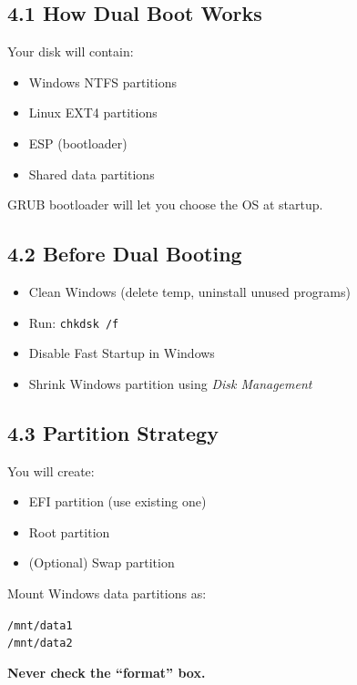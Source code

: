 \documentclass[12pt]{article}
\begin{document}
\subsection*{4.1 How Dual Boot Works}

Your disk will contain:

\begin{itemize}
    \item Windows NTFS partitions
    \item Linux EXT4 partitions
    \item ESP (bootloader)
    \item Shared data partitions
\end{itemize}

GRUB bootloader will let you choose the OS at startup.

\subsection*{4.2 Before Dual Booting}

\begin{itemize}
    \item Clean Windows (delete temp, uninstall unused programs)
    \item Run: \texttt{chkdsk /f}
    \item Disable Fast Startup in Windows
    \item Shrink Windows partition using \textit{Disk Management}
\end{itemize}

\subsection*{4.3 Partition Strategy}

You will create:

\begin{itemize}
    \item EFI partition (use existing one)
    \item Root partition
    \item (Optional) Swap partition
\end{itemize}

Mount Windows data partitions as:

\begin{highlightbox}
\texttt{/mnt/data1}\\
\texttt{/mnt/data2}
\end{highlightbox}

\begin{warningbox}
\textbf{Never check the ``format'' box.}
\end{warningbox}
\end{document}
